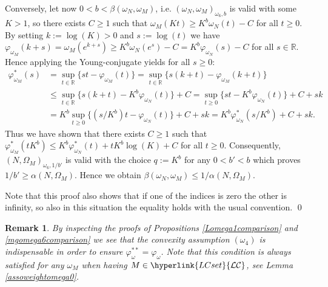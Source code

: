 \documentclass[10pt]{amsart}%
\numberwithin{equation}{section}
\theoremstyle{plain}
\newtheorem{remark}[proposition]{Remark}
\newcommand{\RR}{\mathbb{R}}
\let\on=\operatorname
\begin{document}
Conversely, let now $0<b<\beta(\omega_{N},\omega_{M})$, i.e. $(\omega_{N},\omega_{M})_{\omega_6,b}$ is valid with some $K>1$, so there exists $C\ge 1$  such that $\omega_{M}(Kt)\ge K^b\omega_{N}(t)-C$ for all $t\ge 0$. By setting $k:=\log(K)>0$ and $s:=\log(t)$ we have $\varphi_{\omega_{M}}(k+s)=\omega_{M}(e^{k+s})\ge K^b\omega_{N}(e^s)-C=K^b\varphi_{\omega_{N}}(s)-C$ for all $s\in\RR$. Hence applying the Young-conjugate yields for all $s\ge 0$:
\begin{align*}
\varphi^{*}_{\omega_{M}}(s)&=\sup_{t\in\RR}\{st-\varphi_{\omega_{M}}(t)\}=\sup_{t\in\RR}\{s(k+t)-\varphi_{\omega_{M}}(k+t)\}
\\&
\le\sup_{t\in\RR}\{s(k+t)-K^b\varphi_{\omega_{N}}(t)\}+C=\sup_{t\ge 0}\{st-K^b\varphi_{\omega_{N}}(t)\}+C+sk
\\&
=K^b\sup_{t\ge 0}\{(s/K^b)t-\varphi_{\omega_{N}}(t)\}+C+sk=K^b\varphi^{*}_{\omega_{N}}(s/K^b)+C+sk.
\end{align*}
Thus we have shown that there exists $C\geq 1$ such that $\varphi^{*}_{\omega_{M}}(tK^b)\le K^b\varphi^{*}_{\omega_{N}}(t)+tK^b\log(K)+C $ for all $t\ge 0$.
Consequently,  $(N,\Omega_{M})_{\omega_6,1/b'}$ is valid with the choice $q:=K^b$ for any $0<b'<b$ which proves $1/b'\ge \alpha(N,\Omega_{M})$. Hence  we obtain $\beta(\omega_{N},\omega_{M}) \le 1/\alpha(N, \Omega_M)$.\vspace{6pt}

Note that this proof also shows that if one of the indices is zero the other is infinity, so also in this situation the equality holds with the usual convention.
\qed\enddemo

\begin{remark}
By inspecting the proofs of Propositions \ref{Lomega1comparison} and \ref{mgomega6comparison} we see that the convexity assumption \hyperlink{om4}{$(\omega_4)$} is indispensable in order to ensure $\varphi^{**}_{\omega}=\varphi_{\omega}$. Note that this condition is always satisfied for any $\omega_M$ when having $M\in\hyperlink{LCset}{\mathcal{LC}}$, see Lemma \ref{assoweightomega0}.
\end{remark}




\end{document}
